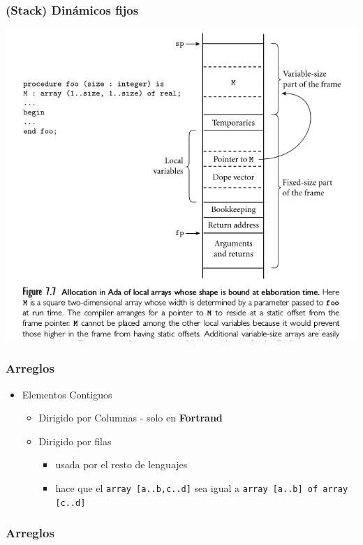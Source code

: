 \documentclass[11pt]{article}
\begin{document}
\subsubsection*{(Stack) Dinámicos fijos}
\label{sec:orgheadline18}

\includegraphics[width=.9\linewidth]{adaarreglo.png}

\subsubsection*{Arreglos}
\label{sec:orgheadline19}
\begin{itemize}
\item Elementos Contiguos
\begin{itemize}
\item Dirigido por Columnas - solo en \textbf{Fortrand}
\item Dirigido por filas
\begin{itemize}
\item usada por el resto de lenguajes
\item hace que el \texttt{array [a..b,c..d]} sea igual a \texttt{array [a..b] of array [c..d]}
\end{itemize}
\end{itemize}
\end{itemize}

\subsubsection*{Arreglos}
\label{sec:orgheadline20}
\end{document}
